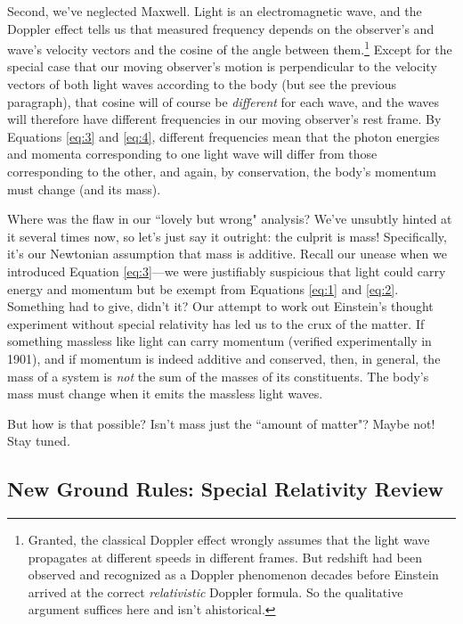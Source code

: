 \documentclass[12pt]{article}
\begin{document}
Second, we've neglected Maxwell. Light is an electromagnetic wave, and the Doppler effect tells us that measured frequency depends on the observer's and wave's velocity vectors and the cosine of the angle between them.\footnote{Granted, the classical Doppler effect wrongly assumes that the light wave propagates at different speeds in different frames. But redshift had been observed and recognized as a Doppler phenomenon decades before Einstein arrived at the correct \emph{relativistic} Doppler formula. So the qualitative argument suffices here and isn't ahistorical.} Except for the special case that our moving observer's motion is perpendicular to the velocity vectors of both light waves according to the body (but see the previous paragraph), that cosine will of course be \emph{different} for each wave, and the waves will therefore have different frequencies in our moving observer's rest frame. By Equations \ref{eq:3} and \ref{eq:4}, different frequencies mean that the photon energies and momenta corresponding to one light wave will differ from those corresponding to the other, and again, by conservation, the body's momentum must change (and its mass\textinterrobang).

Where was the flaw in our ``lovely but wrong" analysis? We've unsubtly hinted at it several times now, so let's just say it outright: the culprit is mass! Specifically, it's our Newtonian assumption that mass is additive. Recall our unease when we introduced Equation \ref{eq:3}---we were justifiably suspicious that light could carry energy and momentum but be exempt from Equations \ref{eq:1} and \ref{eq:2}. Something had to give, didn't it? Our attempt to work out Einstein's thought experiment without special relativity has led us to the crux of the matter. If something massless like light can carry momentum (verified experimentally in 1901), and if momentum is indeed additive and conserved, then, in general, the mass of a system is \emph{not} the sum of the masses of its constituents. The body's mass must change when it emits the massless light waves.

But how is that possible? Isn't mass just the ``amount of matter"? Maybe not! Stay tuned.



\subsection{New Ground Rules: Special Relativity Review}\label{ssec:sr}
\end{document}
